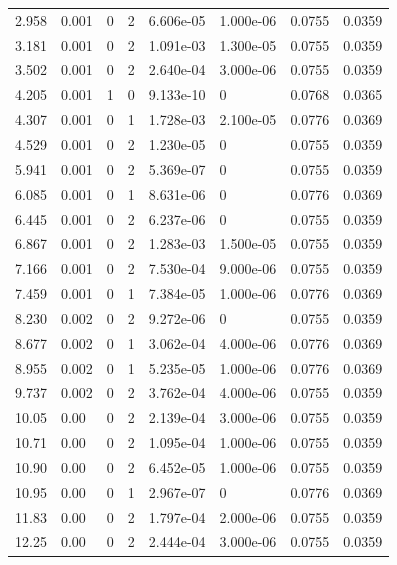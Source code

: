 \documentclass[preview]{standalone}
\begin{document}
{{\begin{tabular}{L{1.2cm}C{1.2cm} C{0.3cm}C{0.5cm} C{1.4cm}C{1.4cm} C{1.4cm}C{1.4cm}}
  2.958  &  0.001  & 0     &  2 &  6.606e-05  & 1.000e-06  & 0.0755 &  0.0359   \\ 
  3.181  &  0.001  & 0     &  2 &  1.091e-03  & 1.300e-05  & 0.0755 &  0.0359   \\ 
  3.502  &  0.001  & 0     &  2 &  2.640e-04  & 3.000e-06  & 0.0755 &  0.0359   \\ 
  4.205  &  0.001  & 1     &  0 &  9.133e-10  & 0  & 0.0768 &  0.0365   \\ 
  4.307  &  0.001  & 0     &  1 &  1.728e-03  & 2.100e-05  & 0.0776 &  0.0369   \\ 
  4.529  &  0.001  & 0     &  2 &  1.230e-05  & 0  & 0.0755 &  0.0359   \\ 
  5.941  &  0.001  & 0     &  2 &  5.369e-07  & 0  & 0.0755 &  0.0359   \\ 
  6.085  &  0.001  & 0     &  1 &  8.631e-06  & 0  & 0.0776 &  0.0369   \\ 
  6.445  &  0.001  & 0     &  2 &  6.237e-06  & 0  & 0.0755 &  0.0359   \\ 
  6.867  &  0.001  & 0     &  2 &  1.283e-03  & 1.500e-05  & 0.0755 &  0.0359   \\ 
  7.166  &  0.001  & 0     &  2 &  7.530e-04  & 9.000e-06  & 0.0755 &  0.0359   \\ 
  7.459  &  0.001  & 0     &  1 &  7.384e-05  & 1.000e-06  & 0.0776 &  0.0369   \\ 
  8.230  &  0.002  & 0     &  2 &  9.272e-06  & 0  & 0.0755 &  0.0359   \\ 
  8.677  &  0.002  & 0     &  1 &  3.062e-04  & 4.000e-06  & 0.0776 &  0.0369   \\ 
  8.955  &  0.002  & 0     &  1 &  5.235e-05  & 1.000e-06  & 0.0776 &  0.0369   \\ 
  9.737  &  0.002  & 0     &  2 &  3.762e-04  & 4.000e-06  & 0.0755 &  0.0359   \\ 
  10.05  &  0.00  & 0     &  2 &  2.139e-04  & 3.000e-06  & 0.0755 &  0.0359   \\ 
  10.71  &  0.00  & 0     &  2 &  1.095e-04  & 1.000e-06  & 0.0755 &  0.0359   \\ 
  10.90  &  0.00  & 0     &  2 &  6.452e-05  & 1.000e-06  & 0.0755 &  0.0359   \\ 
  10.95  &  0.00  & 0     &  1 &  2.967e-07  & 0  & 0.0776 &  0.0369   \\ 
  11.83  &  0.00  & 0     &  2 &  1.797e-04  & 2.000e-06  & 0.0755 &  0.0359   \\ 
  12.25  &  0.00  & 0     &  2 &  2.444e-04  & 3.000e-06  & 0.0755 &  0.0359   \\ 

\end{tabular}}}
\end{document}
